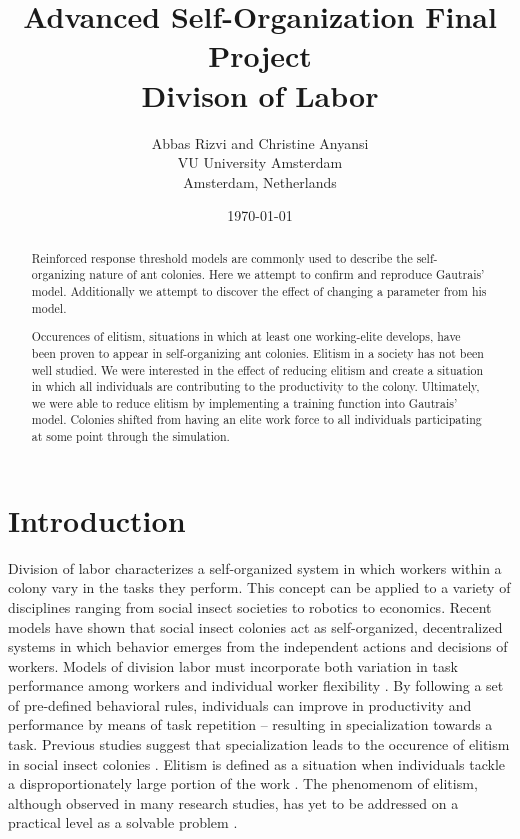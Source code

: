 \documentclass[a4paper]{article}
\title{Advanced Self-Organization Final Project\\Divison of Labor}
\author{Abbas Rizvi and Christine Anyansi\\VU University Amsterdam\\Amsterdam, Netherlands}
\date{\today}
\begin{document}
\maketitle

\newpage
\tableofcontents
\newpage

\begin{abstract}
Reinforced response threshold models are commonly used to  describe the self-organizing nature of ant colonies. Here we attempt to confirm and reproduce Gautrais' model. Additionally we attempt to discover the effect of changing a parameter from his model.  


Occurences of elitism, situations in which at least one working-elite develops, have been proven to appear in self-organizing ant colonies. Elitism in a society has not been well studied.  We were interested in the effect of reducing elitism and create a situation in which all individuals are contributing to the productivity to the colony.  Ultimately, we were able to reduce elitism by implementing a training function into Gautrais’ model.  Colonies shifted from having an elite work force to all individuals participating at some point through the simulation.
  
\end{abstract}

\section{Introduction}
Division of labor characterizes a self-organized system in which workers within a colony vary in the tasks they perform.  This concept can be applied to a variety of disciplines ranging from social insect societies to robotics to economics. Recent models have shown that social insect colonies act as self-organized, decentralized systems in which behavior emerges from the independent actions and decisions of workers.  Models of division labor must incorporate both variation in task performance among workers and individual worker flexibility \cite{Beshers}. By following a set of pre-defined behavioral rules, individuals can improve in productivity and performance by means of task repetition -- resulting in specialization towards a task.  %
Previous studies suggest that  specialization leads to the occurence of elitism in social insect colonies \cite{Gautrais}.  Elitism is defined as a situation when individuals tackle a disproportionately large portion of the work \cite{Gautrais}. The phenomenom of elitism, although observed in many research studies, has yet to be addressed on a practical level as a solvable problem \cite{Gautrais}\cite{evolution}\cite{bonabeau}.
\end{document}

